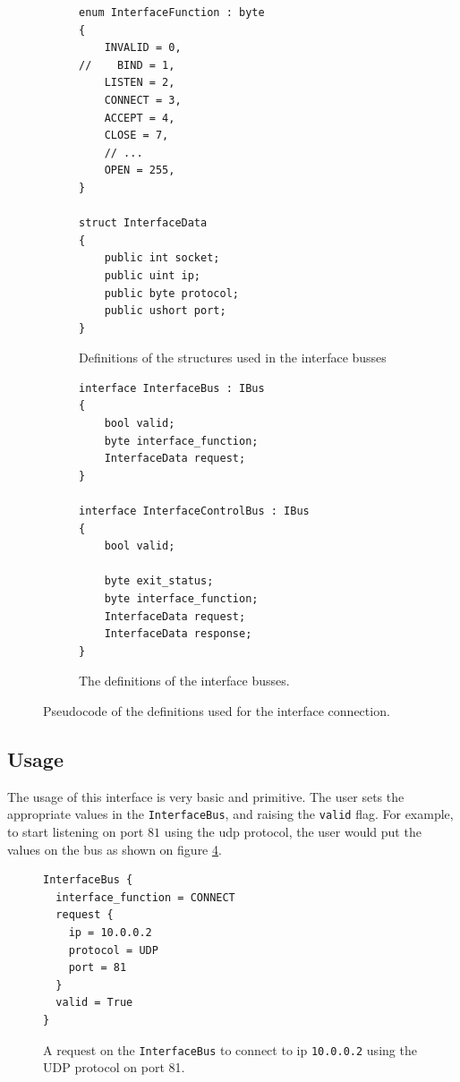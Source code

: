 \begin{figure}[t]
    \centering

    \begin{subfigure}[b]{0.45\textwidth}
	\centering
	 \begin{lstlisting}[language={[Sharp]C}]
enum InterfaceFunction : byte
{
    INVALID = 0,
//    BIND = 1,
    LISTEN = 2,
    CONNECT = 3,
    ACCEPT = 4,
    CLOSE = 7,
    // ...
    OPEN = 255,
}

struct InterfaceData
{
    public int socket;
    public uint ip;
    public byte protocol;
    public ushort port;
}\end{lstlisting}

        \caption{Definitions of the structures used in the interface busses}
	\label{fig:interfacefunction_code}
    \end{subfigure}
\hfill
    \begin{subfigure}[b]{0.45\textwidth}
	\centering
	 \begin{lstlisting}[language={[Sharp]C}]
interface InterfaceBus : IBus
{
    bool valid;
    byte interface_function;
    InterfaceData request;
}

interface InterfaceControlBus : IBus
{
    bool valid;

    byte exit_status;
    byte interface_function;
    InterfaceData request;
    InterfaceData response;
}\end{lstlisting}
	\caption{The definitions of the interface busses.}
	\label{fig:interfacebus_code}
    \end{subfigure}
    \caption{Pseudocode of the definitions used for the interface connection.}
	\label{fig:interface_definition}
\end{figure}




\subsection{Usage}
The usage of this interface is very basic and primitive. The user sets the
appropriate values in the \texttt{InterfaceBus}, and raising the \texttt{valid}
flag. For example, to start listening on port $81$ using the \gls{udp}
protocol, the user would put the values on the bus as shown on figure
\ref{fig:interface_request}.
\begin{figure}
\centering
\begin{Verbatim}[frame=single,samepage=true]
InterfaceBus {
  interface_function = CONNECT
  request {
    ip = 10.0.0.2
    protocol = UDP
    port = 81
  }
  valid = True
}
\end{Verbatim}
	\caption{A request on the \texttt{InterfaceBus} to connect to ip
	\texttt{10.0.0.2} using the UDP protocol on port 81.}
	\label{fig:interface_request}
\end{figure}


